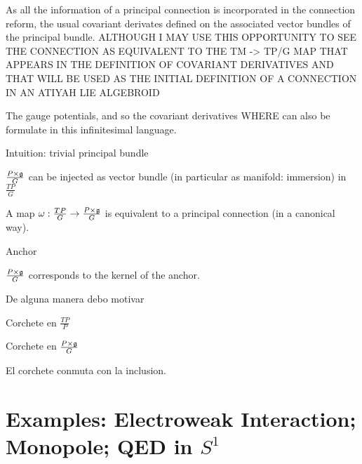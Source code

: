 As all the information of a principal connection is incorporated in the connection reform, the usual covariant derivates defined on the associated vector bundles of the principal bundle. ALTHOUGH I MAY USE THIS OPPORTUNITY TO SEE THE CONNECTION AS EQUIVALENT TO THE TM -> TP/G MAP THAT APPEARS IN THE DEFINITION OF COVARIANT DERIVATIVES AND THAT WILL BE USED AS THE INITIAL DEFINITION OF A CONNECTION IN AN ATIYAH LIE ALGEBROID


The gauge potentials, and so the covariant derivatives WHERE can also be formulate in this infinitesimal language. 

Intuition: trivial principal bundle

\begin{proposition}
$\frac{P \times \mathfrak{g}}{G}$ can be injected as vector bundle (in particular as manifold: immersion) in $\frac{TP}{G}$
\end{proposition}

\begin{theorem}
A map $\omega:\frac{TP}{G} \to \frac{P \times \mathfrak{g}}{G}$ is equivalent to a principal connection (in a canonical way).
\end{theorem}

\begin{definition}
Anchor
\end{definition}

\begin{proposition}
$\frac{P \times \mathfrak{g}}{G}$ corresponds to the kernel of the anchor.
\end{proposition}

De alguna manera debo motivar 

\begin{definition}
Corchete en $\frac{TP}{P}$
\end{definition}

\begin{definition}
Corchete en $\frac{P \times \mathfrak{g}}{G}$
\end{definition}

\begin{proposition}
El corchete conmuta con la inclusion.
\end{proposition}


\section{Examples: Electroweak Interaction; Monopole; QED in $S^1$}


